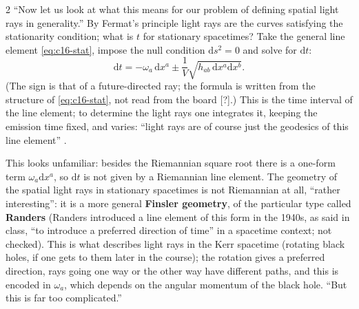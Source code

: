 \begin{paracol}{2}
``Now let us look at what this means for our problem of defining spatial light rays in generality.'' By Fermat's principle light rays are the curves satisfying the stationarity condition; what is $t$ for stationary spacetimes? Take the general line element \eqref{eq:c16-stat}, impose the null condition $\mathrm ds^2=0$ and solve for $\mathrm dt$:
\[
  \mathrm dt=-\omega_a\,\mathrm dx^a\pm\frac1V\sqrt{h_{ab}\,\mathrm dx^a\mathrm dx^b}.
\]
(The sign is that of a future-directed ray; the formula is written from the structure of \eqref{eq:c16-stat}, not read from the board [?].) This is the time interval of the line element; to determine the light rays one integrates it, keeping the emission time fixed, and varies: ``light rays are of course just the geodesics of this line element'' .

This looks unfamiliar: besides the Riemannian square root there is a one-form term $\omega_a\mathrm dx^a$, so $\mathrm dt$ is not given by a Riemannian line element. The geometry of the spatial light rays in stationary spacetimes is not Riemannian at all, ``rather interesting'': it is a more general \textbf{Finsler geometry}, of the particular type called \textbf{Randers} (Randers introduced a line element of this form in the 1940s, as said in class, ``to introduce a preferred direction of time'' in a spacetime context; not checked). This is what describes light rays in the Kerr spacetime (rotating black holes, if one gets to them later in the course); the rotation gives a preferred direction, rays going one way or the other way have different paths, and this is encoded in $\omega_a$, which depends on the angular momentum of the black hole. ``But this is far too complicated.'' 


\end{paracol}
